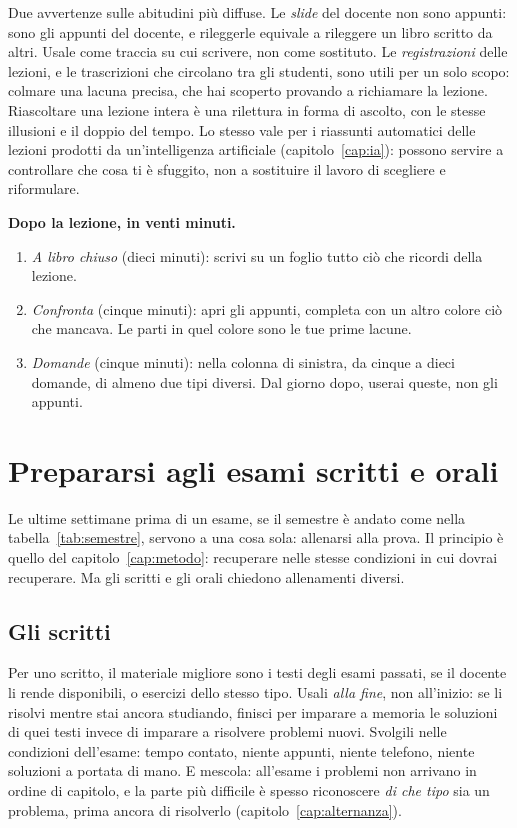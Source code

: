 Due avvertenze sulle abitudini più diffuse. Le \emph{slide} del
docente non sono appunti: sono gli appunti del docente, e rileggerle
equivale a rileggere un libro scritto da altri. Usale come traccia su
cui scrivere, non come sostituto. Le \emph{registrazioni} delle
lezioni, e le trascrizioni che circolano tra gli studenti, sono utili
per un solo scopo: colmare una lacuna precisa, che hai scoperto
provando a richiamare la lezione. Riascoltare una lezione intera è una
rilettura in forma di ascolto, con le stesse illusioni e il doppio del
tempo. Lo stesso vale per i riassunti automatici delle lezioni prodotti
da un'intelligenza artificiale (capitolo~\ref{cap:ia}): possono servire
a controllare che cosa ti è sfuggito, non a sostituire il lavoro di
scegliere e riformulare.

\begin{inpratica}
\textbf{Dopo la lezione, in venti minuti.}
\begin{enumerate}
  \item \emph{A libro chiuso} (dieci minuti): scrivi su un foglio tutto
        ciò che ricordi della lezione.
  \item \emph{Confronta} (cinque minuti): apri gli appunti, completa
        con un altro colore ciò che mancava. Le parti in quel colore
        sono le tue prime lacune.
  \item \emph{Domande} (cinque minuti): nella colonna di sinistra, da
        cinque a dieci domande, di almeno due tipi diversi. Dal giorno
        dopo, userai queste, non gli appunti.
\end{enumerate}
\end{inpratica}

\section{Prepararsi agli esami scritti e orali}

Le ultime settimane prima di un esame, se il semestre è andato come
nella tabella~\ref{tab:semestre}, servono a una cosa sola: allenarsi
alla prova. Il principio è quello del capitolo~\ref{cap:metodo}:
recuperare nelle stesse condizioni in cui dovrai recuperare. Ma gli
scritti e gli orali chiedono allenamenti diversi.

\subsection*{Gli scritti}

Per uno scritto, il materiale migliore sono i testi degli esami
passati, se il docente li rende disponibili, o esercizi dello stesso
tipo. Usali \emph{alla fine}, non all'inizio: se li risolvi mentre stai
ancora studiando, finisci per imparare a memoria le soluzioni di quei
testi invece di imparare a risolvere problemi nuovi. Svolgili nelle
condizioni dell'esame: tempo contato, niente appunti, niente telefono,
niente soluzioni a portata di mano. E mescola: all'esame i problemi non
arrivano in ordine di capitolo, e la parte più difficile è spesso
riconoscere \emph{di che tipo} sia un problema, prima ancora di
risolverlo (capitolo~\ref{cap:alternanza}).

